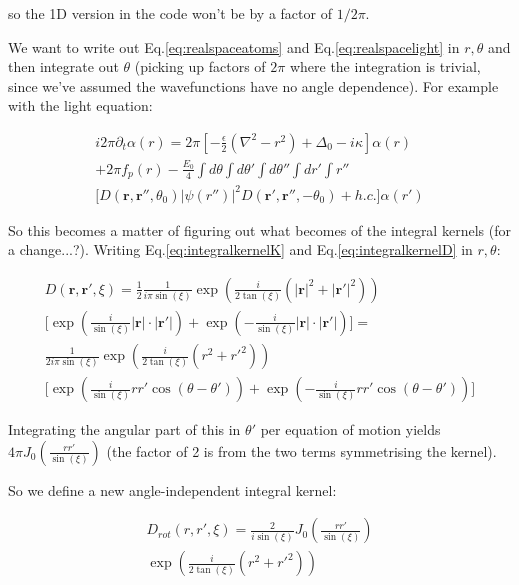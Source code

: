 \documentclass[a4paper,twocolumn,nobalancelastpage]{revtex4-1}
\begin{document}
so the 1D version in the code won't be by a factor of $1/2\pi$.

We want to write out Eq.\ref{eq:realspaceatoms} and Eq.\ref{eq:realspacelight} in $r,\theta$ and then integrate out $\theta$ (picking up factors of $2\pi$ where the integration is trivial, since we've assumed the wavefunctions have no angle dependence). For example with the light equation:

\begin{multline}
\label{eq:integrateouttheta}
i 2 \pi \partial_t \alpha(r)= 2\pi \left[ -\frac{\epsilon}{2} \left( \nabla^2 - r^2 \right) + \Delta_0 -i\kappa \right] \alpha(r)\\ +2\pi  f_p(r)- \frac{E_0}{4}
\int d\theta \int d\theta'\int d\theta'' \int dr'\int r'' \\ \bigg[ D(\textbf{r},\textbf{r}'',\theta_0) |\psi(r'')|^2  D(\textbf{r}',\textbf{r}'',-\theta_0)  + h.c.\bigg]\alpha(r')
\end{multline}

So this becomes a matter of figuring out what becomes of the integral kernels (for a change...?).
Writing Eq.\ref{eq:integralkernelK} and Eq.\ref{eq:integralkernelD} in $r,\theta$:

\begin{multline}
D(\textbf{r},\textbf{r}',\xi)=\frac{1}{2}\frac{1}{i \pi \sin(\xi)}  
\exp{\left( \frac{i }{2\tan(\xi) } 
(|\textbf{r}|^2+|\textbf{r}'|^2) \right)}
\\ \bigg[
\exp{ \left(
\frac{i }{\sin(\xi)} |\textbf{r}|\cdot|\textbf{r}'|
\right)
}
+
\exp{ \left(
-\frac{i }{\sin(\xi)} |\textbf{r}|\cdot|\textbf{r}'|
\right)
}
\bigg]=\\
\frac{1}{2 i \pi \sin(\xi)}  
\exp{\left( \frac{i }{2\tan(\xi) } 
(r^2+r'^2) \right)}
\\ \bigg[
\exp{ \left(
\frac{i }{\sin(\xi)} r r' \cos(\theta-\theta')
\right)
}
+
\exp{ \left(
-\frac{i }{\sin(\xi)} r r' \cos(\theta-\theta')
\right)
}
\bigg]
\end{multline}

Integrating the angular part of this in $\theta'$ per equation of motion yields $ 4 \pi J_0\left( \frac{r r'}{\sin(\xi)}\right)$ (the factor of 2 is from the two terms symmetrising the kernel).

So we define a new angle-independent integral kernel:

\begin{multline}
D_{rot}(r,r',\xi)=\frac{2}{i \sin(\xi)} J_0\left( \frac{r r'}{\sin(\xi)} \right)  \\
\exp{\left( \frac{i }{2\tan(\xi) } 
(r^2+r'^2) \right)}
\end{multline}
\end{document}
